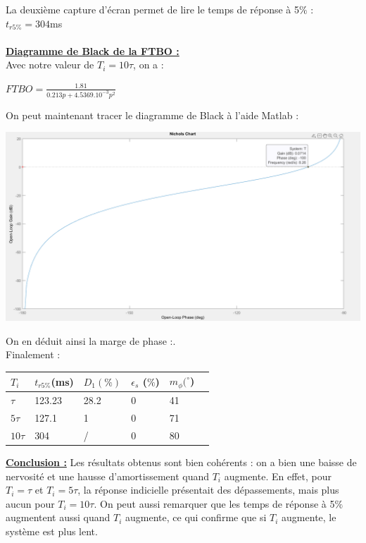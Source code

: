 \documentclass[12pt]{article}
\begin{document}
La deuxième capture d'écran permet de lire le temps de réponse à 5$\%$ : $t_{r5\%} = 304$ms
\\\\\underline{\bf Diagramme de Black de la FTBO :}
\\\normalsize Avec notre valeur de $T_i = 10\tau$, on a :
\begin{center}
    \large$FTBO = \frac{1.81}{0.213p + 4.5369.10^{-3}p^2}$
\end{center}
\normalsize On peut maintenant tracer le diagramme de Black à l'aide Matlab :
\begin{center}
    \includegraphics[width = 16 cm]{TP2 Simulink/Syst_1/Ti=10tau_syst_1_Black.png}
\end{center}
On en déduit ainsi la marge de phase :.
\\Finalement : 
\begin{center}
    \begin{tabular}{ |p{1cm}|p{2.5cm}|p{2.5cm}|p{2.5cm}|p{2.5cm}|p{2.5cm}|}

        \hline
        $T_i$ & $t_{r5\%}$(ms) &$D_1 (\%)$ & $\epsilon_s$ ($\%$)&$m_{\phi} (^{\circ}$)\\
        \hline
        $\tau$& 123.23 & 28.2 & 0 & 41\\
        $5\tau$ & 127.1 & 1 & 0 & 71  \\
        $10\tau$ & 304 & / & 0 & 80   \\
        \hline
        \end{tabular}
    \end{center}
\underline{\bf Conclusion :} Les résultats obtenus sont bien cohérents : on a bien une baisse de nervosité et une hausse d'amortissement quand $T_i$ augmente.
En effet, pour $T_i = \tau$ et $T_i = 5\tau$, la réponse indicielle présentait des dépassements, mais plus aucun pour $T_i = 10\tau$. On peut aussi remarquer que les temps de réponse à 5$\%$ augmentent aussi quand $T_i$ augmente, ce qui confirme que si $T_i$ augmente, le système est plus lent.
\end{document}

